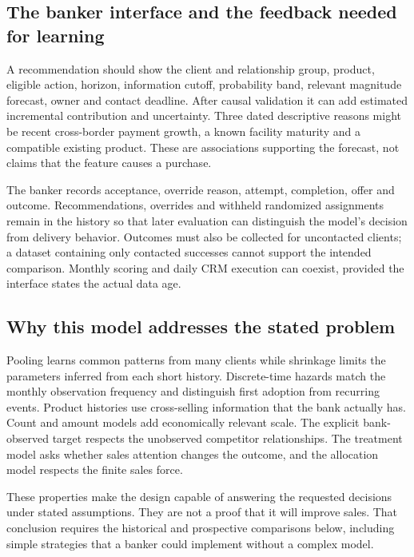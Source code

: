 \subsection{The banker interface and the feedback needed for learning}

A recommendation should show the client and relationship group, product, eligible action, horizon, information cutoff, probability band, relevant magnitude forecast, owner and contact deadline. After causal validation it can add estimated incremental contribution and uncertainty. Three dated descriptive reasons might be recent cross-border payment growth, a known facility maturity and a compatible existing product. These are associations supporting the forecast, not claims that the feature causes a purchase.

The banker records acceptance, override reason, attempt, completion, offer and outcome. Recommendations, overrides and withheld randomized assignments remain in the history so that later evaluation can distinguish the model's decision from delivery behavior. Outcomes must also be collected for uncontacted clients; a dataset containing only contacted successes cannot support the intended comparison. Monthly scoring and daily CRM execution can coexist, provided the interface states the actual data age.

\subsection{Why this model addresses the stated problem}

Pooling learns common patterns from many clients while shrinkage limits the parameters inferred from each short history. Discrete-time hazards match the monthly observation frequency and distinguish first adoption from recurring events. Product histories use cross-selling information that the bank actually has. Count and amount models add economically relevant scale. The explicit bank-observed target respects the unobserved competitor relationships. The treatment model asks whether sales attention changes the outcome, and the allocation model respects the finite sales force.

These properties make the design capable of answering the requested decisions under stated assumptions. They are not a proof that it will improve sales. That conclusion requires the historical and prospective comparisons below, including simple strategies that a banker could implement without a complex model.
